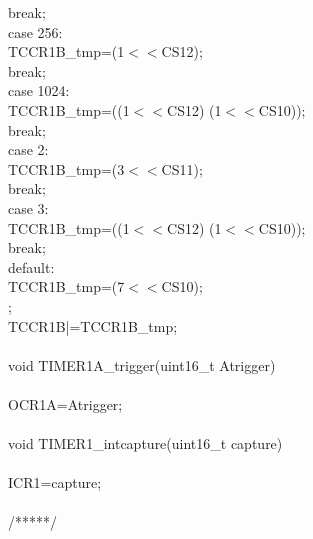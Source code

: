 \documentclass[titlepage, a4paper, 10pt, reqno, openany]{report}
\begin{document}
\begin{minipage}[t]{.35\linewidth}
\hspace*{1.5cm}			break; \\
\hspace*{1cm}		case 256: \\
\hspace*{1.5cm}			TCCR1B\_tmp=(1$<<$CS12); \\
\hspace*{1.5cm}			break; \\
\hspace*{1cm}		case 1024: \\
\hspace*{1.5cm}			TCCR1B\_tmp=((1$<<$CS12) \textbar (1$<<$CS10)); \\
\hspace*{1.5cm}			break; \\
\hspace*{1cm}		case 2: \\
\hspace*{1.5cm}			TCCR1B\_tmp=(3$<<$CS11); \\
\hspace*{1.5cm}			break; \\
\hspace*{1cm}		case 3: \\
\hspace*{1.5cm}			TCCR1B\_tmp=((1$<<$CS12) \textbar (1$<<$CS10)); \\
\hspace*{1.5cm}			break; \\
\hspace*{1cm}		default: \\
\hspace*{1.5cm}			TCCR1B\_tmp=(7$<<$CS10); \\
\hspace*{.5cm}	\textbraceright ; \\
\hspace*{.5cm}	TCCR1B|=TCCR1B\_tmp; \\
\textbraceright \\
void TIMER1A\_trigger(uint16\_t Atrigger) \\
\textbraceleft \\
\hspace*{.5cm}	OCR1A=Atrigger; \\
\textbraceright \\
void TIMER1\_intcapture(uint16\_t capture) \\
\textbraceleft \\
\hspace*{.5cm}	ICR1=capture; \\
\textbraceright \\
/*****/
\end{minipage}
\end{document}
